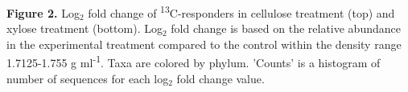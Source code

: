 \textbf{Figure 2.}  Log$_{2}$ fold change of \textsuperscript{13}C-responders in cellulose treatment (top) and xylose treatment (bottom).  Log$_{2}$ fold change is based on the relative abundance in the experimental treatment compared to the control within the density range 1.7125-1.755 g ml\textsuperscript{-1}. Taxa are colored by phylum. 'Counts' is a histogram of number of sequences for each log$_{2}$ fold change value.    
